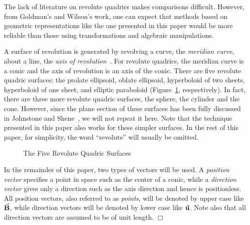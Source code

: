      The lack of literature on revolute quadrics makes comparisons
difficult.  However, from Goldman's and Wilson's work, one can expect
that methods
based on geometric representations like the one presented in this paper would
be more reliable than those using transformations and algebraic manipulations.

     A surface of revolution is generated by revolving a curve, the
{\em meridian curve}, about a line,
the {\em axis of revolution}~\cite{rogers-adams:1990}.
For revolute quadrics, the meridian curve is a conic and the axis of revolution
is an axis of the conic.
There are five revolute quadric
surfaces: the prolate ellipsoid, oblate ellipsoid, hyperboloid of two sheets,
hyperboloid of one sheet, and elliptic paraboloid (Figure~\ref{fig:revQ},
respectively).
In fact, there are three more revolute quadric surfaces, the sphere, the
cylinder and the cone.  However, since the plane section of these surfaces has
been fully discussed in Johnstone and Shene~\cite{johnstone-shene:1991}, we
will not repeat it here.  Note that the technique presented in this paper also
works for these simpler surfaces.  In the rest of this paper, for simplicity,
the word ``revolute'' will usually be omitted.
\begin{figure}
\vspace{16.5cm}
\caption{The Five Revolute Quadric Surfaces}
\label{fig:revQ}
\end{figure}

\begin{remark} \rm
     In the remainder of this paper, two types of vectors will be used.
A {\em position vector} specifies a point in space such as the center of
a conic, while a {\em direction vector} gives only a direction such as the
axis direction and hence is positionless.  All position vectors,
also referred to as {\em points},  will be
denoted by upper case like $\vec{\bf B}$, while direction vectors will be
denoted by
lower case like $\vec{\bf u}$.  Note also that all direction vectors are
assumed to be of unit length. $\Box$
\end{remark}

